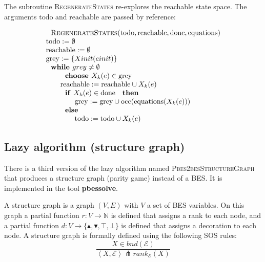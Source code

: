 The subroutine \textsc{RegenerateStates} re-explores the reachable state
space. The arguments $\mathrm{todo}$ and $\mathrm{reachable}$ are passed by
reference:

\begin{equation*}
\begin{array}{l}
\text{\textsc{RegenerateStates}}(\mathrm{todo},\mathrm{reachable},\mathrm{%
done},\mathrm{equations}) \\ 
\mathrm{todo}:=\emptyset \\ 
\mathrm{reachable}:=\emptyset \\ 
\mathrm{grey}:=\{Xinit(einit)\} \\ 
\text{\textbf{while }}grey\neq \emptyset \\ 
\qquad \text{\textbf{choose }}X_{k}(e)\in \mathrm{grey} \\ 
\qquad \mathrm{reachable}:=\mathrm{reachable}\cup X_{k}(e) \\ 
\qquad \text{\textbf{if }}X_{k}(e)\in \mathrm{done}\text{ \textbf{then }} \\ 
\qquad \qquad \mathrm{grey}:=\mathrm{grey}\cup \mathrm{occ}(\mathrm{equations%
}(X_{k}(e))) \\ 
\qquad \text{\textbf{else }} \\ 
\qquad \qquad \mathrm{todo}:=\mathrm{todo}\cup X_{k}(e)%
\end{array}%
\end{equation*}%
\newpage

\subsection{Lazy algorithm (structure graph)}

There is a third version of the lazy algorithm named \textsc{%
Pbes2besStructureGraph} that produces a structure graph (parity game)
instead of a BES. It is implemented in the tool \textbf{pbessolve}.

A structure graph is a graph $(V,E)$ with $V$ a set of BES variables. On
this graph a partial function $r:V\rightarrow \mathbb{N}$ is defined that
assigns a rank to each node, and a partial function $d:V\rightarrow
\{\blacktriangle ,\blacktriangledown ,\top ,\bot \}$ is defined that assigns
a decoration to each node. A structure graph is formally defined using the
following SOS rules:%
\begin{equation*}
\frac{X\in bnd(\mathcal{E})}{\left\langle X,\mathcal{E}\right\rangle
\pitchfork rank_{\mathcal{E}}(X)}
\end{equation*}

